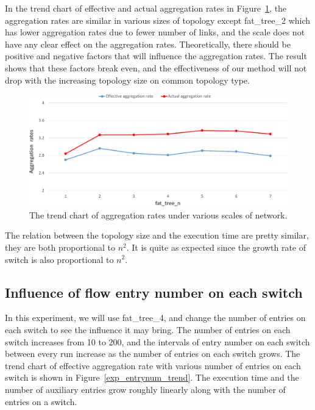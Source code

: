 \documentclass[conference]{IEEEtran}
\begin{document}
In the trend chart of effective and actual aggregation rates in Figure~\ref{different_scale_rate_trend}, the aggregation rates are similar in various sizes of topology except fat\_tree\_2 which has lower aggregation rates due to fewer number of links, and the scale does not have any clear effect on the aggregation rates. Theoretically, there should be positive and negative factors that will influence the aggregation rates. The result shows that these factors break even, and the effectiveness of our method will not drop with the increasing topology size on common topology type.

\begin{figure}[ht]
\centering
\includegraphics[width=1\linewidth]{figures/exp_scale_rate_trend.pdf}
\caption{The trend chart of aggregation rates under various scales of network.}
\label{different_scale_rate_trend}
\end{figure}

The relation between the topology size and the execution time are pretty similar, they are both proportional to $n^2$. It is quite as expected since the growth rate of switch is also proportional to $n^2$.

\subsection{Influence of flow entry number on each switch}
In this experiment, we will use fat\_tree\_4, and change the number of entries on each switch to see the influence it may bring. The number of entries on each switch increases from 10 to 200, and the intervals of entry number on each switch between every run increase as the number of entries on each switch grows. The trend chart of effective aggregation rate with various number of entries on each switch is shown in Figure~\ref{exp_entrynum_trend}. The execution time and the number of auxiliary entries grow roughly linearly along with the number of entries on a switch.
\end{document}
